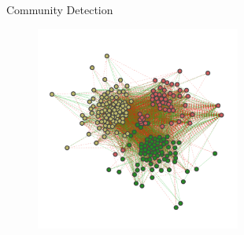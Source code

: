 \begin{frame}{Community Detection}

\begin{figure}[!htb]
\centering
\includegraphics[width=0.6\textwidth]{Images/communities.pdf}
\label{fig:communities}
\end{figure}
    
\end{frame}